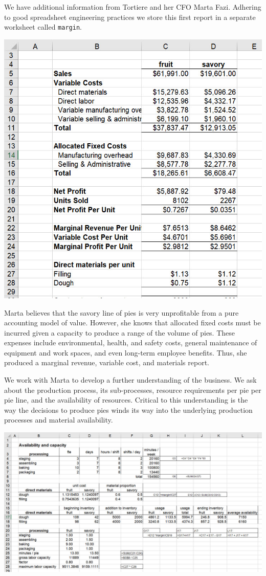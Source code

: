 \documentclass[
]{book}
\begin{document}
We have additional information from Tortiere and her CFO Marta Fazi. Adhering to good spreadsheet engineering practices we store this first report in a separate worksheet called \texttt{margin}.

\includegraphics{images/03/pie-2-product-margin.jpg}

Marta believes that the savory line of pies is very unprofitable from a pure accounting model of value. However, she knows that allocated fixed costs must be incurred given a capacity to produce a range of the volume of pies. These expenses include environmental, health, and safety costs, general maintenance of equipment and work spaces, and even long-term employee benefits. Thus, she produced a marginal revenue, variable cost, and materials report.

We work with Marta to develop a further understanding of the business. We ask about the production process, its sub-processes, resource requirements per pie per pie line, and the availability of resources. Critical to this understanding is the way the decisions to produce pies winds its way into the underlying production processes and material availability.

\includegraphics{images/03/pie-2-product-availability.jpg}
\end{document}
